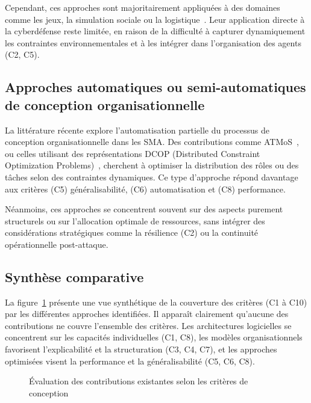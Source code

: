 \documentclass[ twoside,openright,titlepage,numbers=noenddot,headinclude,%
                footinclude=true,cleardoublepage=empty,abstractoff, %
                BCOR=5mm,paper=a4,fontsize=11pt,%
                french,american,%
                ]{scrreprt}
\begin{document}
Cependant, ces approches sont majoritairement appliquées à des domaines comme les jeux, la simulation sociale ou la logistique~\cite{ricordel2000analysis}. Leur application directe à la cyberdéfense reste limitée, en raison de la difficulté à capturer dynamiquement les contraintes environnementales et à les intégrer dans l'organisation des agents (C2, C5).

\subsection*{Approches automatiques ou semi-automatiques de conception organisationnelle}

La littérature récente explore l'automatisation partielle du processus de conception organisationnelle dans les SMA. Des contributions comme ATMoS~\cite{atmos2019}, ou celles utilisant des représentations DCOP (Distributed Constraint Optimization Problems)~\cite{modi2005adopt}, cherchent à optimiser la distribution des rôles ou des tâches selon des contraintes dynamiques. Ce type d'approche répond davantage aux critères (C5) généralisabilité, (C6) automatisation et (C8) performance.

Néanmoins, ces approches se concentrent souvent sur des aspects purement structurels ou sur l'allocation optimale de ressources, sans intégrer des considérations stratégiques comme la résilience (C2) ou la continuité opérationnelle post-attaque.

\subsection*{Synthèse comparative}

La figure~\ref{fig:revue-couverture-criteres} présente une vue synthétique de la couverture des critères (C1 à C10) par les différentes approches identifiées. Il apparaît clairement qu'aucune des contributions ne couvre l'ensemble des critères. Les architectures logicielles se concentrent sur les capacités individuelles (C1, C8), les modèles organisationnels favorisent l'explicabilité et la structuration (C3, C4, C7), et les approches optimisées visent la performance et la généralisabilité (C5, C6, C8).

\begin{figure}[h]
    \centering
    \caption{Évaluation des contributions existantes selon les critères de conception}
    \label{fig:revue-couverture-criteres}
\end{figure}
\end{document}
